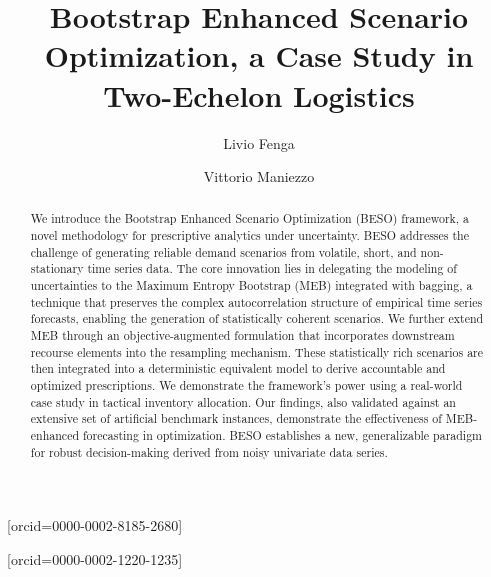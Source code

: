 \documentclass[a4paper,fleqn,3p,11pt,authoryear]{cas-sc}
\begin{document}
\let\WriteBookmarks\relax
\def\floatpagepagefraction{1}
\def\textpagefraction{.001}

\setlength{\abovedisplayskip}{2pt plus 2pt minus 4pt}
\setlength{\belowdisplayskip}{2pt plus 2pt minus 4pt}


 
\title [mode = title]{Bootstrap Enhanced Scenario Optimization, a Case Study in Two-Echelon Logistics}                      

\author[1]{Livio Fenga}[orcid=0000-0002-8185-2680]


\author[2]{Vittorio Maniezzo}[orcid=0000-0002-1220-1235]
\cormark[2]



\begin{abstract}
We introduce the Bootstrap Enhanced Scenario Optimization (BESO) framework, a novel methodology for prescriptive analytics under uncertainty. BESO addresses the challenge of generating reliable demand scenarios from volatile, short, and non-stationary time series data. The core innovation lies in delegating the modeling of uncertainties to the Maximum Entropy Bootstrap (MEB) integrated with bagging, a technique that preserves the complex autocorrelation structure of empirical time series forecasts, enabling the generation of statistically coherent scenarios. We further extend MEB through an objective-augmented formulation that incorporates downstream recourse elements into the resampling mechanism. These statistically rich scenarios are then integrated into a deterministic equivalent model to derive accountable and optimized prescriptions. We demonstrate the framework's power using a real-world case study in tactical inventory allocation. Our findings, also validated against an extensive set of artificial benchmark instances, demonstrate the effectiveness of MEB-enhanced forecasting in optimization. BESO establishes a new, generalizable paradigm for robust decision-making derived from noisy univariate data series.
\end{abstract}
\end{document}
